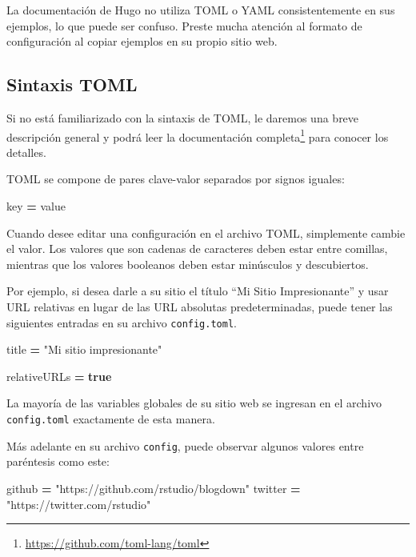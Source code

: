 \documentclass[12pt,]{krantz}
\makeatletter
\newenvironment{Shaded}{\begin{snugshade}}{\end{snugshade}}
\newcommand{\KeywordTok}[1]{\textcolor[rgb]{0.13,0.29,0.53}{\textbf{#1}}}
\newcommand{\NormalTok}[1]{#1}
\newcommand{\OperatorTok}[1]{\textcolor[rgb]{0.81,0.36,0.00}{\textbf{#1}}}
\newcommand{\StringTok}[1]{\textcolor[rgb]{0.31,0.60,0.02}{#1}}
\renewcommand{\href}[2]{#2\footnote{\url{#1}}}
\newenvironment{kframe}{%
\medskip{}
\setlength{\fboxsep}{.8em}
 \def\at@end@of@kframe{}%
 \ifinner\ifhmode%
  \def\at@end@of@kframe{\end{minipage}}%
  \begin{minipage}{\columnwidth}%
 \fi\fi%
 \def\FrameCommand##1{\hskip\@totalleftmargin \hskip-\fboxsep
 \colorbox{shadecolor}{##1}\hskip-\fboxsep
     \hskip-\linewidth \hskip-\@totalleftmargin \hskip\columnwidth}%
 \MakeFramed {\advance\hsize-\width
   \@totalleftmargin\z@ \linewidth\hsize
   \@setminipage}}%
 {\par\unskip\endMakeFramed%
 \at@end@of@kframe}
\renewenvironment{Shaded}{\begin{kframe}}{\end{kframe}}
\theoremstyle{definition}
\theoremstyle{definition}
\theoremstyle{definition}
\theoremstyle{remark}
\makeatother
\begin{document}
La documentación de Hugo no utiliza TOML o YAML consistentemente en sus
ejemplos, lo que puede ser confuso. Preste mucha atención al formato de
configuración al copiar ejemplos en su propio sitio web.

\hypertarget{sintaxis-toml}{%
\subsection{Sintaxis TOML}\label{sintaxis-toml}}

Si no está familiarizado con la sintaxis de TOML, le daremos una breve
descripción general y podrá leer la
\href{https://github.com/toml-lang/toml}{documentación completa} para
conocer los detalles.

TOML se compone de pares clave-valor separados por signos iguales:

\begin{Shaded}
\begin{Highlighting}[]
\NormalTok{key }\OperatorTok{=}\NormalTok{ value}
\end{Highlighting}
\end{Shaded}

Cuando desee editar una configuración en el archivo TOML, simplemente
cambie el valor. Los valores que son cadenas de caracteres deben estar
entre comillas, mientras que los valores booleanos deben estar
minúsculos y descubiertos.

Por ejemplo, si desea darle a su sitio el título ``Mi Sitio
Impresionante'' y usar URL relativas en lugar de las URL absolutas
predeterminadas, puede tener las siguientes entradas en su archivo
\texttt{config.toml}.

\begin{Shaded}
\begin{Highlighting}[]
\NormalTok{title }\OperatorTok{=} \StringTok{"Mi sitio impresionante"}

\NormalTok{relativeURLs }\OperatorTok{=} \KeywordTok{true}
\end{Highlighting}
\end{Shaded}

La mayoría de las variables globales de su sitio web se ingresan en el
archivo \texttt{config.toml} exactamente de esta manera.

Más adelante en su archivo \texttt{config}, puede observar algunos
valores entre paréntesis como este:

\begin{Shaded}
\begin{Highlighting}[]
\NormalTok{[social]}
\NormalTok{    github  }\OperatorTok{=} \StringTok{"https://github.com/rstudio/blogdown"}
\NormalTok{    twitter }\OperatorTok{=} \StringTok{"https://twitter.com/rstudio"}
\end{Highlighting}
\end{Shaded}
\end{document}
